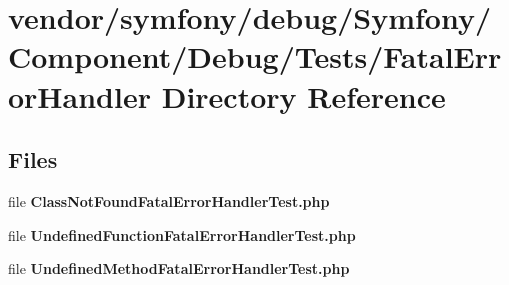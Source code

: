 \section{vendor/symfony/debug/\+Symfony/\+Component/\+Debug/\+Tests/\+Fatal\+Error\+Handler Directory Reference}
\label{dir_268d16ce9efe833b34e49e2c8360463e}
\subsection*{Files}
\begin{DoxyCompactItemize}
\item 
file {\bf Class\+Not\+Found\+Fatal\+Error\+Handler\+Test.\+php}
\item 
file {\bf Undefined\+Function\+Fatal\+Error\+Handler\+Test.\+php}
\item 
file {\bf Undefined\+Method\+Fatal\+Error\+Handler\+Test.\+php}
\end{DoxyCompactItemize}
